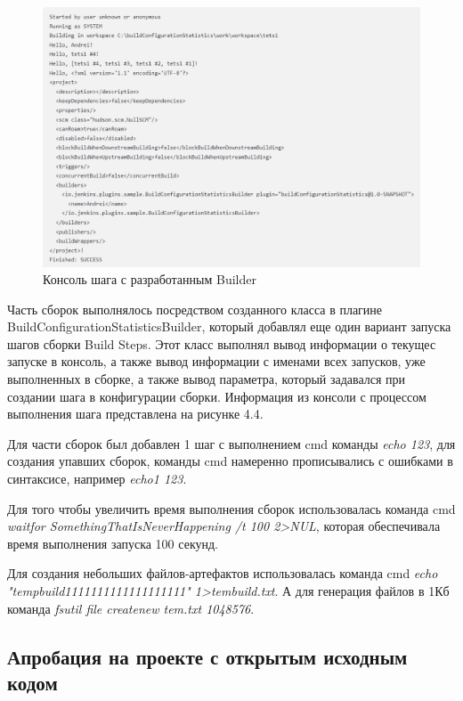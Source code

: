  \begin{figure}[ht!] 
	\center
	\includegraphics [scale=0.57] {my_folder/images//console1}
	\caption{Консоль шага с разработанным Builder} 
	\label{fig:customBuilder}  
\end{figure}

Часть сборок выполнялось посредством созданного класса в плагине BuildConfigurationStatisticsBuilder, который добавлял еще один вариант запуска шагов сборки Build Steps. Этот класс выполнял вывод информации о текущес запуске в консоль, а также вывод информации с именами всех запусков, уже выполненных в сборке, а также вывод параметра, который задавался при создании шага в конфигурации сборки. Информация из консоли с процессом выполнения шага представлена на рисунке 4.4.



Для части сборок был добавлен 1 шаг с выполнением cmd команды  \textit{echo 123}, для создания упавших сборок, команды cmd намеренно прописывались с ошибками в синтаксисе, например  \textit{echo1 123}.

Для того чтобы увеличить время выполнения сборок использовалась команда cmd  \textit{waitfor SomethingThatIsNeverHappening /t 100  2>NUL}, которая обеспечивала время выполнения запуска 100 секунд.

Для создания небольших файлов-артефактов использовалась команда cmd \textit{echo "tempbuild1111111111111111111"  1>tembuild.txt}. А для генерация файлов в 1Кб команда \textit{fsutil file createnew tem.txt 1048576}.

\subsection{Апробация на проекте с открытым исходным кодом}

